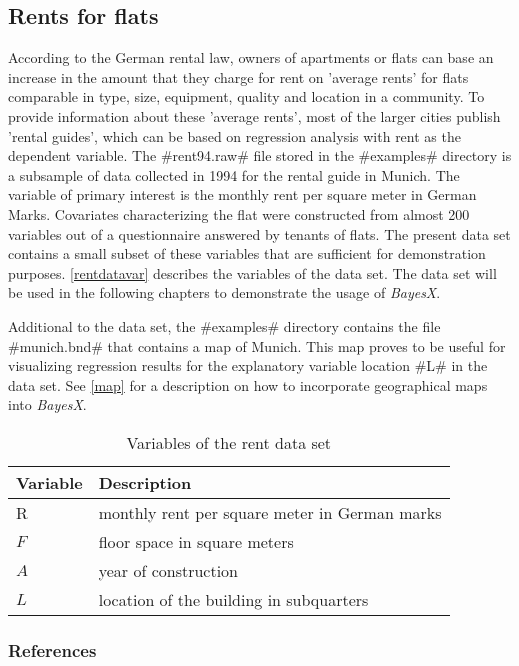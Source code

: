 \subsection{Rents for flats}
\label{rentdata}  

According to the German rental law, owners of apartments or flats
can base an increase in the amount that they charge for rent on
'average rents' for flats comparable in type, size, equipment,
quality and location in a community. To provide information about
these 'average rents', most of the larger cities publish 'rental
guides', which can be based on regression analysis with rent as
the dependent variable. The #rent94.raw# file stored in the
#examples# directory is a subsample of data collected in 1994 for
the rental guide in Munich. The variable of primary interest is
the monthly rent per square meter in German Marks. Covariates
characterizing the flat were constructed from almost 200 variables
out of a questionnaire answered by tenants of flats. The present
data set contains a small subset of these variables that are
sufficient for demonstration purposes. \autoref{rentdatavar} describes the
variables of the data set. The data set will be used in the
following chapters to demonstrate the usage of {\em BayesX}.

Additional to the data set, the #examples# directory contains
the file #munich.bnd# that contains a map of Munich. This map
proves to be useful for visualizing regression results for the
explanatory variable location #L# in the data set. See
\autoref{map} for a description on how to incorporate geographical
maps into {\em BayesX}.

\begin{table}

\centering
\begin{tabular}{|l|l|}
\hline
{\bf Variable} & {\bf Description} \\
\hline
R & monthly rent per square meter in German marks \\
$F$ & floor space in square meters \\
$A$ & year of construction \\
$L$ & location of the building in subquarters \\
 \hline
\end{tabular}
{\em \caption{\label{rentdatavar}Variables of the rent data set}}
\end{table}


\subsubsection*{References}

